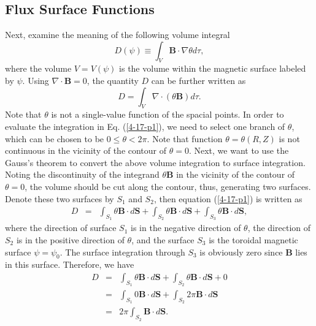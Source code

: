 \documentclass{article}
\begin{document}
\

\

\

\subsection{\label{7-25-e1}Flux Surface Functions}

Next, examine the meaning of the following volume integral
\begin{equation}
  D (\psi) \equiv \int_V \mathbf{B} \cdot \nabla \theta d \tau,
\end{equation}
where the volume $V = V (\psi)$ is the volume within the magnetic surface
labeled by $\psi$. Using $\nabla \cdot \mathbf{B}= 0$, the quantity $D$ can be
further written as
\begin{equation}
  \label{4-17-p1} D = \int_V \nabla \cdot (\theta \mathbf{B}) d \tau .
\end{equation}
Note that $\theta$ is not a single-value function of the spacial points. In
order to evaluate the integration in Eq. (\ref{4-17-p1}), we need to select
one branch of $\theta$, which can be chosen to be $0 \leqslant \theta < 2
\pi$. Note that function $\theta = \theta (R, Z)$ is not continuous in the
vicinity of the contour of $\theta = 0$. Next, we want to use the Gauss's
theorem to convert the above volume integration to surface integration. Noting
the discontinuity of the integrand $\theta \mathbf{B}$ in the vicinity of the
contour of $\theta = 0$, the volume should be cut along the contour, thus,
generating two surfaces. Denote these two surfaces by $S_1$ and $S_2$, then
equation (\ref{4-17-p1}) is written as
\begin{eqnarray*}
  D & = & \int_{S_1} \theta \mathbf{B} \cdot d\mathbf{S}+ \int_{S_2} \theta
  \mathbf{B} \cdot d\mathbf{S}+ \int_{S_3} \theta \mathbf{B} \cdot
  d\mathbf{S},
\end{eqnarray*}
where the direction of surface $S_1$ is in the negative direction of $\theta$,
the direction of $S_2$ is in the positive direction of $\theta$, and the
surface $S_3$ is the toroidal magnetic surface $\psi = \psi_0$. The surface
integration through $S_3$ is obviously zero since $\mathbf{B}$ lies in this
surface. Therefore, we have
\begin{eqnarray}
  D & = & \int_{S_1} \theta \mathbf{B} \cdot d\mathbf{S}+ \int_{S_2} \theta
  \mathbf{B} \cdot d\mathbf{S}+ 0 \nonumber\\
  & = & \int_{S_1} 0\mathbf{B} \cdot d\mathbf{S}+ \int_{S_2} 2 \pi \mathbf{B}
  \cdot d\mathbf{S} \nonumber\\
  & = & 2 \pi \int_{S_2} \mathbf{B} \cdot d\mathbf{S}.  \label{4-18-4}
\end{eqnarray}
\end{document}
